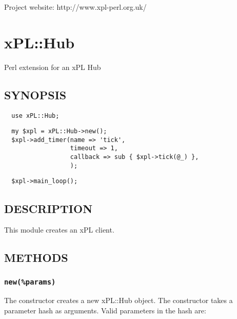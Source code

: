 \documentclass[12pt,a4paper]{article}
\begin{document}
Project website: http://www.xpl-perl.org.uk/

\newpage
\section{xPL::Hub\label{xPL::Hub}}


Perl extension for an xPL Hub

\subsection*{SYNOPSIS\label{xPL::Hub_SYNOPSIS}}
\begin{verbatim}
  use xPL::Hub;
\end{verbatim}
\begin{verbatim}
  my $xpl = xPL::Hub->new();
  $xpl->add_timer(name => 'tick',
                  timeout => 1,
                  callback => sub { $xpl->tick(@_) },
                  );
\end{verbatim}
\begin{verbatim}
  $xpl->main_loop();
\end{verbatim}
\subsection*{DESCRIPTION\label{xPL::Hub_DESCRIPTION}}


This module creates an xPL client.

\subsection*{METHODS\label{xPL::Hub_METHODS}}
\subsubsection*{\texttt{new(\%params)}\label{xPL::Hub_new_params_}}


The constructor creates a new xPL::Hub object.  The constructor
takes a parameter hash as arguments.  Valid parameters in the hash
are:
\end{document}
